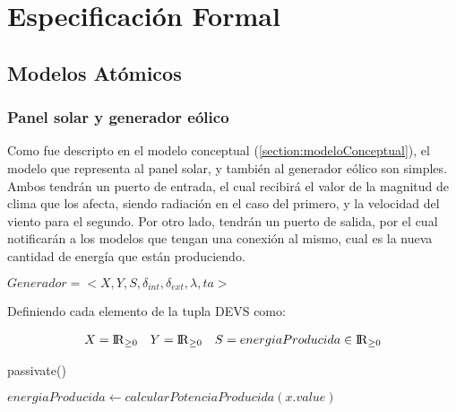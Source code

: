\newcommand{\Reals}{{\rm I\!R}}

\section{Especificación Formal}

\subsection{Modelos Atómicos}

\subsubsection{Panel solar y generador eólico}
Como fue descripto en el modelo conceptual (\ref{section:modeloConceptual}),
el modelo que representa al panel solar, y también al generador eólico son
simples. Ambos tendrán un puerto de entrada, el cual recibirá el valor de la
magnitud de clima que los afecta, siendo radiación en el caso del primero, y
la velocidad del viento para el segundo. Por otro lado, tendrán un puerto de
salida, por el cual notificarán a los modelos que tengan una conexión al
mismo, cual es la nueva cantidad de energía que están produciendo.


$Generador = <X,Y,S,\delta_{int}, \delta_{ext}, \lambda, ta>$

Definiendo cada elemento de la tupla DEVS como:

\begin{align*}
X &= \Reals_{\geq0} & Y &= \Reals_{\geq0} & S &= energiaProducida \in \Reals_{\geq 0} \\
\end{align*}

\begin{algorithm}
    \caption{$\delta_{int} (s)$}
    \begin{algorithmic}
    \STATE passivate()
    \end{algorithmic}
\end{algorithm}

\begin{algorithm}
    \caption{$\delta_{ext} (s,e,x)$}
    \begin{algorithmic}
    \STATE $energiaProducida \leftarrow calcularPotenciaProducida(x.value) $
    \end{algorithmic}
\end{algorithm}

